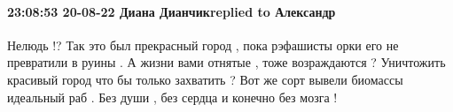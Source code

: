  
 
 
 
 

\paragraph{23:08:53 20-08-22 Диана Дианчикreplied to Александр}

Нелюдь !? Так это был прекрасный город , пока рэфашисты орки его не превратили
в руины . А жизни вами отнятые , тоже возраждаются ? Уничтожить красивый город
что бы только захватить ? Вот же сорт вывели биомассы идеальный раб . Без души
, без сердца и конечно без мозга !
